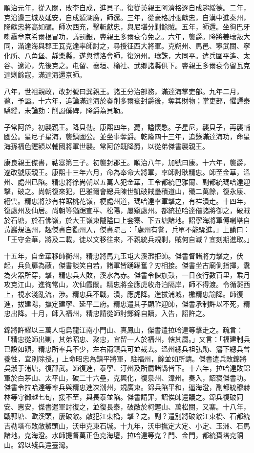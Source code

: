 \begin{pinyinscope}
順治元年，從入關，敗李自成，進貝子。復從英親王阿濟格逐自成趨綏德。二年，克沿邊三城及延安，自成遁湖廣，師還。三年，從豪格討張獻忠，自漢中進秦州，降獻忠將高如礪。師次西充，擊斬獻忠，與尼堪分剿餘賊。五年，師還。坐徇巴牙喇纛章京希爾根冒功，議罰銀，睿親王多爾袞令免之。六年，襲爵。降將姜瓖叛大同，滿達海與郡王瓦克達率師討之，尋授征西大將軍。克朔州、馬邑、寧武關、寧化所、八角堡、靜樂縣，遂與博洛會師，復汾州。瓖誅，大同平。遣兵圍平遙、太谷、遼沁，先後克之。屯留、襄垣、榆社、武鄉諸縣俱下。睿親王多爾袞令留瓦克達剿餘寇，滿達海還京師。

八年，世祖親政，改封號曰巽親王。諸王分治部務，滿達海掌吏部。九年二月，薨，予謚。十六年，追論滿達海於奏削多爾袞封爵後，奪其財物；掌吏部，懼譚泰驕縱，未論劾：削謚僕碑，降爵為貝勒。

子常阿岱，初襲親王。降貝勒。康熙四年，薨，謚懷愍。子星尼，襲貝子，再襲輔國公。星尼子星海，襲鎮國公。並坐事奪爵。乾隆四十三年，追錄滿達海功，命星海孫福色鏗額以輔國將軍世襲。常阿岱既降爵，以從弟傑書襲親王。

康良親王傑書，祜塞第三子。初襲封郡王。順治八年，加號曰康。十六年，襲爵，遂改號康親王。康熙十三年六月，命為奉命大將軍，率師討耿精忠。師至金華，溫州、處州已陷。精忠將徐尚朝以五萬人犯金華，王令都統巴雅爾、副都統瑪哈達迎擊，破之。尚朝復來犯，巴雅爾會總兵陳世凱破賊壘積道山，殲二萬餘，復永康、縉雲。精忠將沙有祥踞桃花嶺，梗處州道，瑪哈達率軍擊之，有祥潰走。十四年，復處州及仙居。尚朝等猶踞宣平、松陽，屢窺處州。都統拉哈達偕諸將御之，破賊於石塘，於石佛嶺，於大王嶺東隴隘口上套寨、下五塘諸地。詔寧海將軍傅喇塔自黃巖規溫州，趣傑書自衢州入，傑書疏言：「處州有警，兵單不能驟進。」上諭曰：「王守金華，將及二載，徒以文移往來，不親統兵規剿，賊何自滅？宜刻期進取。」

十五年，自金華移師衢州，精忠將馬九玉屯大溪灘拒師。傑書督諸將力擊之，伏起，兵負扉為蔽，傑書談笑自若，諸軍皆踴躍奮？刃相接。傑書坐古廟側指揮，纛為火器所穿，擊，精忠兵大敗，溪水為赤。傑書令偃旗鼓，一日夜行數百里，乘月攻克江山，進徇常山，次仙霞關。精忠將金應虎收舟泊隔岸，師不得渡。令循灘西上，視水淺亂流，涉。精忠兵不戰，潰，應虎降。進拔浦城，檄精忠諭降。師復進，拔建陽，撫定建寧、延平二府。精忠遣其子顯祚迎師，傑書承制許以不死，精忠出降。十月，師入福州，精忠請從師討鄭錦自贖，入告，詔許之。

錦將許耀以三萬人屯烏龍江南小門山、真鳳山，傑書遣拉哈達等擊走之。疏言：「精忠從師出剿，其弟昭忠、聚忠，宜留一人於福州，轄其屬。」又言：「福建制兵已設如額，精忠所率兵不少，左右兩鎮兵可並裁去。溫州總兵祖弘勛、籓下總兵曾養性，宜別除授。」上命昭忠為鎮平將軍，駐福州，餘並如所請。傑書遣兵敗錦將吳淑于浦塘，復邵武。師復進，泰寧、汀州及所屬諸縣皆下。十六年，拉哈達敗錦軍於白茅山、太平山，破二十六壘，克興化，復泉州、漳州。奏入，詔褒傑書功。傑書令拉哈達等率兵與精忠進次潮州，規廣東。錦兵陷平和，逼海澄，副都統穆赫林等守御越七旬，援不至，與長泰並陷。傑書請罪，詔俟師還議之。錦兵復破同安、惠安，傑書遣軍討復之，並復長泰，破敵於柯鏗山、萬松關，又寨。十八年，戰郭塘、歐溪頭，屢破敵。敵犯江東橋，擊？之。副？遣別將破敵江東橋、石都統吉勒塔布敗敵鰲頭山，沃申克東石城。十九年，沃申撫定大定、小定、玉洲、石馬諸地，克海澄。水師提督萬正色克海壇，拉哈達等克？門、金門，都統賚塔克銅山。錦以殘兵還臺灣。


\end{pinyinscope}
